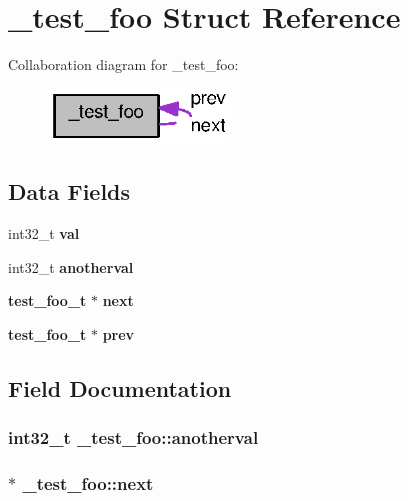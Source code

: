 \section{\_\-test\_\-foo Struct Reference}
\label{struct__test__foo}


Collaboration diagram for \_\-test\_\-foo:\nopagebreak
\begin{figure}[H]
\begin{center}
\leavevmode
\includegraphics[width=137pt]{struct__test__foo__coll__graph}
\end{center}
\end{figure}
\subsection*{Data Fields}
\begin{DoxyCompactItemize}
\item 
int32\_\-t {\bf val}
\item 
int32\_\-t {\bf anotherval}
\item 
{\bf test\_\-foo\_\-t} $\ast$ {\bf next}
\item 
{\bf test\_\-foo\_\-t} $\ast$ {\bf prev}
\end{DoxyCompactItemize}


\subsection{Field Documentation}
\subsubsection[{anotherval}]{\setlength{\rightskip}{0pt plus 5cm}int32\_\-t {\bf \_\-test\_\-foo::anotherval}}\label{struct__test__foo_a64a1c8543436c49859f5448e165ebd80}
\subsubsection[{next}]{ $\ast$ {\bf \_\-test\_\-foo::next}}\label{struct__test__foo_ad839cc82fbd6fba79a935c7f4c31d06e}
